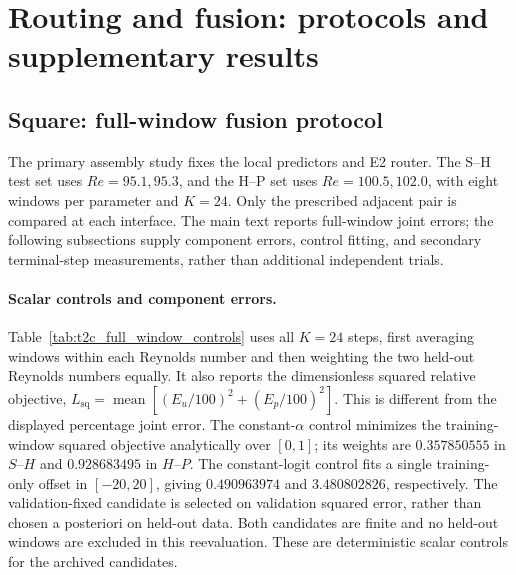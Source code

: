 \section{Routing and fusion: protocols and supplementary results}
\label{app:assembly_results}


\subsection{Square: full-window fusion protocol}
\label{app:square}

The primary assembly study fixes the local predictors and E2 router.
The S--H test set uses $Re=95.1,95.3$, and the H--P set uses
$Re=100.5,102.0$, with eight windows per parameter and $K=24$.
Only the prescribed adjacent pair is compared at each interface.
The main text reports full-window joint errors; the following
subsections supply component errors, control fitting, and secondary
terminal-step measurements, rather than additional independent trials.

\paragraph{Scalar controls and component errors.}
Table~\ref{tab:t2c_full_window_controls} uses all $K=24$ steps, first
averaging windows within each Reynolds number and then weighting the
two held-out Reynolds numbers equally. It also reports the dimensionless
squared relative objective, $L_{\mathrm{sq}}=\operatorname{mean}
[(E_u/100)^2+(E_p/100)^2]$. This is different from the displayed
percentage joint error. The constant-$\alpha$ control minimizes the
training-window squared objective analytically over $[0,1]$; its weights
are $0.357850555$ in $S$--$H$ and $0.928683495$ in $H$--$P$.
The constant-logit control fits a single training-only offset in
$[-20,20]$, giving $0.490963974$ and $3.480802826$, respectively.
The validation-fixed candidate is selected on validation squared error,
rather than chosen a posteriori on held-out data. Both candidates are
finite and no held-out windows are excluded in this reevaluation.
These are deterministic scalar controls for the archived candidates.

